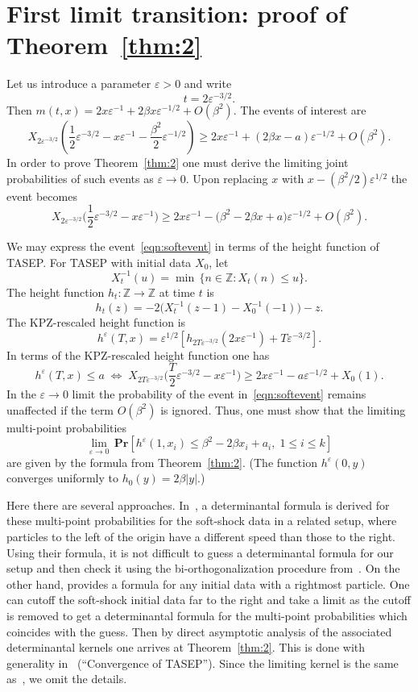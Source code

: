 \documentclass[AHL,Unicode,longabstracts]{cedram}
\newcommand{\pr}[1]{\mathbf{Pr}\left[#1\right]}
\newcommand{\eps}{\varepsilon}
\newcommand{\Z}{\mathbb{Z}}
\begin{document}
\section{First limit transition: proof of Theorem~\ref{thm:2}} \label{sec:KPZlimit}

Let us introduce a parameter $\eps > 0$ and write
\[
t = 2 \eps^{-3/2}.
\]
Then $m(t,x) = 2x \eps^{-1} + 2\beta x \eps^{-1/2} + O(\beta^2)$. The events of interest are
\[
X_{2 \eps^{-3/2}}\left(\frac{1}{2}\eps^{-3/2} -x\eps^{-1} - \frac{\beta^2}{2} \eps^{-1/2}\right) \geq
2x \eps^{-1} + (2\beta x -a)\eps^{-1/2} + O(\beta^2).
\]
In order to prove Theorem~\ref{thm:2} one must derive the limiting joint probabilities of such events as $\eps \to 0$. Upon replacing $x$ with $x - (\beta^2/2)\eps^{1/2}$ the event becomes
\begin{equation}\label{eqn:softevent}
X_{2 \eps^{-3/2}}\Big(\frac{1}{2}\eps^{-3/2} -x\eps^{-1}\Big)
\geq 2x \eps^{-1} - \big(\beta^2 - 2\beta x + a \big)\eps^{-1/2} + O(\beta^2).
\end{equation}

We may express the event~\eqref{eqn:softevent} in terms of the height function of TASEP. For TASEP with initial data $X_0$, let
\[
X_t^{-1}(u) = \min\, \{n \in \Z: X_t(n) \leq u\}.
\]
The height function $h_t: \Z \to \Z$ at time $t$ is
\[
h_t(z) = -2 \big (X_t^{-1}(z-1) - X_0^{-1}(-1) \big) - z.
\]
The KPZ-rescaled height function is
\begin{equation}\label{eqn:KPZh}
h^{\eps}(T,x) = \eps^{1/2} \left [h_{2T\eps^{-3/2}}(2x\eps^{-1}) + T \eps^{-3/2} \right].
\end{equation}
In terms of the KPZ-rescaled height function one has
\[
h^{\eps}(T,x) \leq a \;\Longleftrightarrow\;
X_{2T\eps^{-3/2}}\bigg(\frac{T}{2}\eps^{-3/2} - x\eps^{-1}\bigg) \geq 2x\eps^{-1} - a \eps^{-1/2} + X_0(1).
\]
In the $\eps \to 0$ limit the probability of the event in~\eqref{eqn:softevent} remains unaffected if the term $O(\beta^2)$ is ignored. Thus, one must show that the limiting multi-point probabilities
\[
\lim_{\eps \to 0}\, \pr{ h^{\eps}(1,x_i) \leq \beta^2 - 2\beta x_i +a_i, \; 1\leq i \leq k}
\]
are given by the formula from Theorem~\ref{thm:2}. (The function $h^{\eps}(0,y)$ converges uniformly to $h_0(y)= 2\beta |y|$.)

Here there are several approaches. In~\cite{FN2}, a determinantal formula is derived for these multi-point probabilities for the soft-shock data in a related setup, where particles to the left of the origin have a different speed than those to the right. Using their formula, it is not difficult to guess a determinantal formula for our setup and then check it using the bi-orthogonalization procedure from~\cite{BFPS, Sas}. On the other hand, \cite[Theorem~2.6]{MQR} provides a formula for any initial data with a rightmost particle. One can cutoff the soft-shock initial data far to the right and take a limit as the cutoff is removed to get a determinantal formula for the multi-point probabilities which coincides with the guess. Then by direct asymptotic analysis of the associated determinantal kernels one arrives at Theorem~\ref{thm:2}. This is done with generality in~\cite[Theorem~3.13]{MQR} (``Convergence of TASEP''). Since the limiting kernel is the same as~\cite{FN2}, we omit the details.
\end{document}
